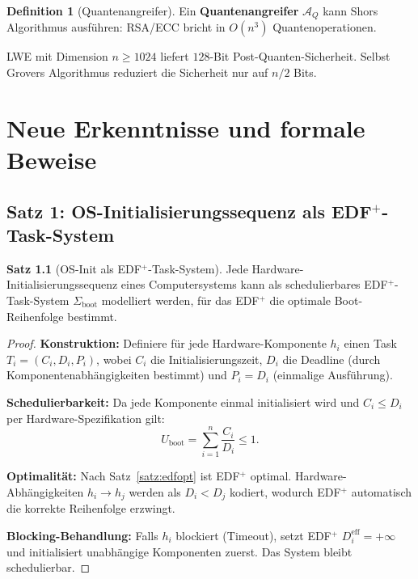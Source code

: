 ﻿\documentclass[a4paper,12pt]{scrreprt}
\theoremstyle{definition}
\newtheorem{definition}{Definition}[chapter]
\newtheorem{satz}{Satz}[chapter]
\begin{document}
	\begin{definition}[Quantenangreifer]
		Ein \textbf{Quantenangreifer} $\mathcal{A}_Q$ kann Shors Algorithmus
		\cite{Shor1994} ausführen: RSA/ECC bricht in $O(n^3)$ Quantenoperationen.
	\end{definition}
	
	LWE mit Dimension $n \geq 1024$ liefert $128$-Bit Post-Quanten-Sicherheit.
	Selbst Grovers Algorithmus reduziert die Sicherheit nur auf $n/2$ Bits.
	
	\chapter{Neue Erkenntnisse und formale Beweise}
	
	\section{Satz 1: OS-Initialisierungssequenz als \texorpdfstring{EDF$^+$}{EDF+}-Task-System}
	
	\begin{satz}[OS-Init als EDF$^+$-Task-System]\label{satz:os_init}
		Jede Hardware-Initialisierungssequenz eines Computersystems kann als
		schedulierbares EDF$^+$-Task-System $\Sigma_{\mathrm{boot}}$ modelliert werden,
		für das EDF$^+$ die optimale Boot-Reihenfolge bestimmt.
	\end{satz}
	
	\begin{proof}
		\textbf{Konstruktion:} Definiere für jede Hardware-Komponente $h_i$
		einen Task $T_i = (C_i, D_i, P_i)$, wobei $C_i$ die Initialisierungszeit,
		$D_i$ die Deadline (durch Komponentenabhängigkeiten bestimmt) und
		$P_i = D_i$ (einmalige Ausführung).
		
		\textbf{Schedulierbarkeit:} Da jede Komponente einmal initialisiert
		wird und $C_i \leq D_i$ per Hardware-Spezifikation gilt:
		\[
		U_{\mathrm{boot}} = \sum_{i=1}^{n} \frac{C_i}{D_i} \leq 1.
		\]
		
		\textbf{Optimalität:} Nach Satz~\ref{satz:edfopt} ist EDF$^+$ optimal.
		Hardware-Abhängigkeiten $h_i \to h_j$ werden als $D_i < D_j$ kodiert,
		wodurch EDF$^+$ automatisch die korrekte Reihenfolge erzwingt.
		
		\textbf{Blocking-Behandlung:} Falls $h_i$ blockiert (Timeout), setzt
		EDF$^+$ $D_i^{\mathrm{eff}} = +\infty$ und initialisiert unabhängige
		Komponenten zuerst. Das System bleibt schedulierbar.
	\end{proof}
	
\end{document}
